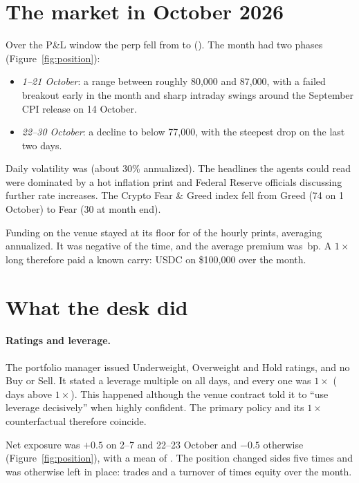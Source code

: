 \section{The market in October 2026}\label{sec:market}

Over the P\&L window the perp fell from \BTCStart{} to \BTCEnd{} (\BTCWindow{}). The month had two phases (Figure~\ref{fig:position}):
\begin{itemize}
\item \emph{1--21 October}: a range between roughly 80{,}000 and 87{,}000, with a failed breakout early in the month and sharp intraday swings around the September CPI release on 14 October.
\item \emph{22--30 October}: a decline to below 77{,}000, with the steepest drop on the last two days.
\end{itemize}
Daily volatility was \BTCsigma{} (about 30\% annualized). The headlines the agents could read were dominated by a hot inflation print and Federal Reserve officials discussing further rate increases. The Crypto Fear \& Greed index fell from Greed (74 on 1 October) to Fear (30 at month end).

Funding on the venue stayed at its floor for \FundBase{} of the \FundPrints{} hourly prints, averaging \FundAnn{} annualized. It was negative \FundNeg{} of the time, and the average premium was \PremBp{}\,bp. A $1\times$ long therefore paid a known carry: \BHFunding{} USDC on \$100{,}000 over the month.

\section{What the desk did}\label{sec:behavior}

\paragraph{Ratings and leverage.} The portfolio manager issued \NUnderweight{} Underweight, \NOverweight{} Overweight and \NHold{} Hold ratings, and no Buy or Sell. It stated a leverage multiple on all \LevStated{} days, and every one was $1\times$ (\LevDays{} days above $1\times$). This happened although the venue contract told it to ``use leverage decisively'' when highly confident. The primary policy and its $1\times$ counterfactual therefore coincide.

Net exposure was $+0.5$ on 2--7 and 22--23 October and $-0.5$ otherwise (Figure~\ref{fig:position}), with a mean of \MeanSignedExp{}. The position changed sides five times and was otherwise left in place: \AgentTrades{} trades and a turnover of \AgentTurnover{} times equity over the month.


